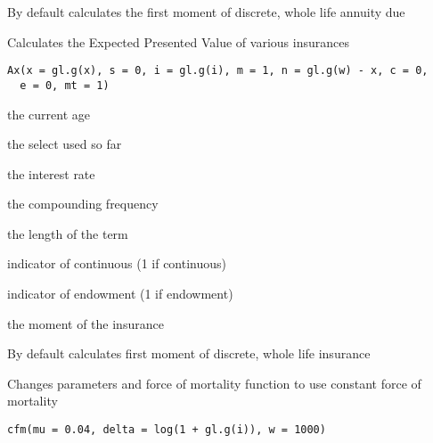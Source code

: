 \documentclass[a4paper]{book}
\begin{document}
%
\begin{Details}\relax
By default calculates the first moment of discrete, whole life annuity due
\end{Details}
%
\begin{Description}\relax
Calculates the Expected Presented Value of various insurances
\end{Description}
%
\begin{Usage}
\begin{verbatim}
Ax(x = gl.g(x), s = 0, i = gl.g(i), m = 1, n = gl.g(w) - x, c = 0,
  e = 0, mt = 1)
\end{verbatim}
\end{Usage}
%
\begin{Arguments}
\begin{ldescription}
\item[\code{x}] the current age

\item[\code{s}] the select used so far

\item[\code{i}] the interest rate

\item[\code{m}] the compounding frequency

\item[\code{n}] the length of the term

\item[\code{c}] indicator of continuous (1 if continuous)

\item[\code{e}] indicator of endowment (1 if endowment)

\item[\code{mt}] the moment of the insurance
\end{ldescription}
\end{Arguments}
%
\begin{Details}\relax
By default calculates first moment of discrete, whole life insurance
\end{Details}
%
\begin{Description}\relax
Changes parameters and force of mortality function to use constant force of mortality
\end{Description}
%
\begin{Usage}
\begin{verbatim}
cfm(mu = 0.04, delta = log(1 + gl.g(i)), w = 1000)
\end{verbatim}
\end{Usage}
\end{document}
